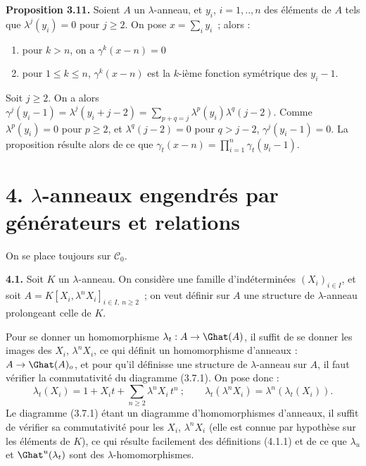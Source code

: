 \textbf{Proposition 3.11.} Soient \(A\) un \(\lambda\)-anneau, et \(y_i\), \(i=1,..,n\) des éléments de \(A\) tels que \(\lambda^j(y_i)=0\) pour \(j\ge2\). On pose \(x=\sum_i y_i\)~; alors :
\begin{enumerate}[label=\roman*)]
\item pour \(k>n\), on a \(\gamma^k(x-n)=0\)
\item pour \(1\le k\le n\), \(\gamma^k(x-n)\) est la \(k\)-ième fonction symétrique des \(y_i-1\).
\end{enumerate}
Soit \(j\ge2\). On a alors \(\gamma^j(y_i-1)=\lambda^j(y_i+j-2)=\sum_{p+q=j}\lambda^p(y_i)\lambda^q(j-2)\). Comme \(\lambda^p(y_i)=0\) pour \(p\ge2\), et \(\lambda^q(j-2)=0\) pour \(q>j-2\), \(\gamma^j(y_i-1)=0\). La proposition résulte alors de ce que \(\gamma_t(x-n)=\prod_{i=1}^{n}\gamma_t(y_i-1)\).

\section*{4. \(\lambda\)-anneaux engendrés par générateurs et relations}

On se place toujours sur \(\mathcal C_0\).

\textbf{4.1.} Soit \(K\) un \(\lambda\)-anneau. On considère une famille d'indéterminées \((X_i)_{i\in I}\), et soit \(A=K[X_i,\lambda^n X_i]_{i\in I,\ n\ge2}\)~; on veut définir sur \(A\) une structure de \(\lambda\)-anneau prolongeant celle de \(K\).

Pour se donner un homomorphisme \(\lambda_t:A\to\Ghat(A)\), il suffit de se donner les images des \(X_i\), \(\lambda^n X_i\), ce qui définit un homomorphisme d'anneaux : \(A\to\Ghat(A)_o\), et pour qu'il définisse une structure de \(\lambda\)-anneau sur \(A\), il faut vérifier la commutativité du diagramme (3.7.1). On pose donc :
\begin{equation}\tag{4.1.1}
  \lambda_t(X_i)=1+X_it+\sum_{n\ge2}\lambda^n X_i\,t^n~;
  \qquad
  \lambda_t(\lambda^n X_i)=\lambda^n(\lambda_t(X_i)).
\end{equation}
Le diagramme (3.7.1) étant un diagramme d'homomorphismes d'anneaux, il suffit de vérifier sa commutativité pour les \(X_i\), \(\lambda^n X_i\) (elle est connue par hypothèse sur les éléments de \(K\)), ce qui résulte facilement des définitions (4.1.1) et de ce que \(\lambda_u\) et \(\Ghat^u(\lambda_t)\) sont des \(\lambda\)-homomorphismes.


